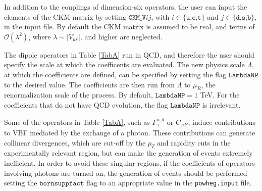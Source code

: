\documentclass[paper]{JHEP3}
\begin{document}
In addition to the couplings of dimension-six operators, the user can input the elements of the CKM matrix by setting  $\texttt{CKM\_V}ij$, with $i \in \{\texttt{u,c,t}\}$ and $j \in \{ \texttt{d,s,b}\}$,
in the input file. By default the CKM matrix is assumed to be real, and terms of $\mathcal O(\lambda^2)$, where $\lambda \sim |V_{us}|$, and higher are neglected. 

The dipole operators in Table \ref{TabA} run in QCD, and therefore the user should specify the scale at which the coefficents are evaluated.
The new physics scale $\Lambda$, at which the coefficients are defined, can be specified 
by setting the flag $\texttt{LambdaNP}$ to the desired value. 
The coefficients are then run from $\Lambda$ to $\mu_R$, the renormalization scale of the  process. By default, $\texttt{LambdaNP} = 1$ TeV.
For the coefficients that do not have QCD evolution, the flag $\texttt{LambdaNP}$ is irrelevant.


Some of the operators in Table \ref{TabA}, such as $\Gamma_\gamma^{u,d}$ or $C_{\varphi B}$, induce contributions  
to VBF mediated by the exchange of a photon. These contributions can generate collinear divergences, which 
are cut-off by the $p_T$ and rapidity cuts in the experimentally relevant region, but can make the generation of events extremely inefficient. 
In order to avoid these singular regions, if the coefficients of operators involving photons are turned on, the generation of events should be performed setting the  $\texttt{bornsuppfact}$ flag to an appropriate value in the \texttt{powheg.input} file.
\end{document}
